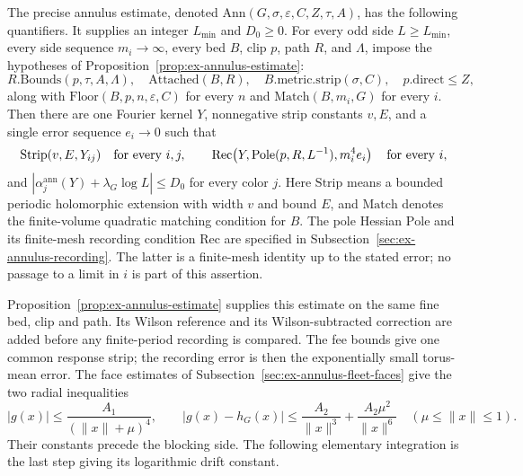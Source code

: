 The precise annulus estimate, denoted $\mathrm{Ann}(G,\sigma,
\varepsilon,C,Z,\tau,A)$, has the following quantifiers. It supplies an
integer $L_{\min}$ and $D_0\geq0$. For every odd side $L\geq L_{\min}$,
every side sequence $m_i\to\infty$, every bed $B$, clip $p$, path $R$, and
$\Lambda$, impose the hypotheses of Proposition~\ref{prop:ex-annulus-estimate}:
\[
 R.\mathrm{Bounds}(p,\tau,A,\Lambda),\quad
 \mathrm{Attached}(B,R),\quad B.\mathrm{metric.strip}(\sigma,C),\quad
 p.\mathrm{direct}\leq Z,
\]
along with $\mathrm{Floor}(B,p,n,\varepsilon,C)$ for every $n$ and
$\mathrm{Match}(B,m_i,G)$ for every $i$. Then there are one Fourier kernel $Y$,
nonnegative strip constants $v,E$, and a single error sequence $e_i\to0$
such that
\[
 \mathrm{Strip}(v,E,Y_{ij})\quad\hbox{for every }i,j,\qquad
 \mathrm{Rec}\!\left(Y,\mathrm{Pole}(p,R,L^{-1}),
          m_i^4e_i\right)\quad\hbox{for every }i,
\]
and $|\alpha^{\mathrm{ann}}_j(Y)+\lambda_G\log L|\leq D_0$ for every color $j$.
Here $\mathrm{Strip}$ means a bounded periodic holomorphic extension
with width $v$ and bound $E$, and $\mathrm{Match}$ denotes the
finite-volume quadratic matching condition for $B$. The pole Hessian
$\mathrm{Pole}$ and its finite-mesh recording condition $\mathrm{Rec}$
are specified in Subsection~\ref{sec:ex-annulus-recording}.
The latter is a finite-mesh identity up to the stated error; no passage to a limit in $i$ is part of this assertion.

Proposition~\ref{prop:ex-annulus-estimate} supplies this estimate on the
same fine bed, clip and path. Its Wilson reference and its Wilson-subtracted
correction are added before any finite-period recording is compared. The
fee bounds give one common response strip; the recording error is then the
exponentially small torus-mean error. The face estimates of
Subsection~\ref{sec:ex-annulus-fleet-faces} give the two radial inequalities
\[
 |g(x)|\leq\frac{A_1}{(\|x\|+\mu)^4},\qquad
 |g(x)-h_G(x)|\leq\frac{A_2}{\|x\|^3}
                   +\frac{A_2\mu^2}{\|x\|^6}
 \quad(\mu\leq\|x\|\leq1).
\]
Their constants precede the blocking side. The following elementary
integration is the last step giving its logarithmic drift constant.

